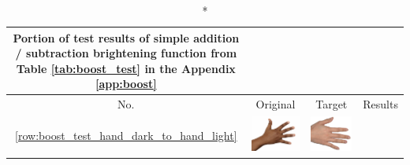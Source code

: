 \documentclass[12pt, a4paper]{article}
\begin{document}
\begin{longtable}{|c||c|c|c|}
    \caption*{Portion of test results of simple addition / subtraction brightening function from Table \ref{tab:boost_test} in the Appendix \ref{app:boost}}\\
    \hline
    No. & Original & Target & Results \\ 
      \hline  \ref{row:boost_test_hand_dark_to_hand_light} &
  \begin{minipage}{.29\textwidth}
    \includegraphics[width=\textwidth,height=\textheight,keepaspectratio]{../inputs/hand_dark.jpg}
  \end{minipage} & 
  \begin{minipage}{.29\textwidth}
    \includegraphics[width=\textwidth,height=\textheight,keepaspectratio]{../inputs/hand_light.jpg}

\end{minipage}
\end{longtable}
\end{document}
